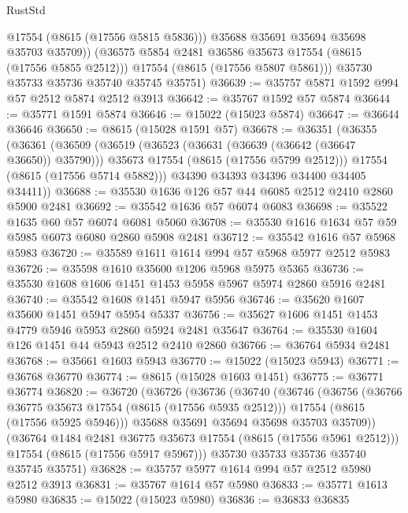 \begin{lexlean}{RustStd}
\begin{coremodule}
              @17554
              (@8615 (@17556 @5815 @5836)))
            @35688
            @35691
            @35694
            @35698
            @35703
            @35709))
        (@36575 @5854 @2481 @36586 @35673 @17554 (@8615 (@17556 @5855 @2512)))
        @17554
        (@8615 (@17556 @5807 @5861)))
      @35730
      @35733
      @35736
      @35740
      @35745
      @35751)
@36639 := @35757 @5871 @1592 @994 @57 @2512 @5874 @2512 @3913
@36642 := @35767 @1592 @57 @5874
@36644 := @35771 @1591 @5874
@36646 := @15022 (@15023 @5874)
@36647 := @36644 @36646
@36650 := @8615 (@15028 @1591 @57)
@36678 := @36351
    (@36355
      (@36361
        (@36509
          (@36519
            (@36523 (@36631 (@36639 (@36642 (@36647 @36650)) @35790)))
            @35673
            @17554
            (@8615 (@17556 @5799 @2512)))
          @17554
          (@8615 (@17556 @5714 @5882)))
        @34390
        @34393
        @34396
        @34400
        @34405
        @34411))
@36688 := @35530 @1636 @126 @57 @44 @6085 @2512 @2410 @2860 @5900 @2481
@36692 := @35542 @1636 @57 @6074 @6083
@36698 := @35522 @1635 @60 @57 @6074 @6081 @5060
@36708 := @35530 @1616 @1634 @57 @59 @5985 @6073 @6080 @2860 @5908 @2481
@36712 := @35542 @1616 @57 @5968 @5983
@36720 := @35589 @1611 @1614 @994 @57 @5968 @5977 @2512 @5983
@36726 := @35598 @1610 @35600 @1206 @5968 @5975 @5365
@36736 := @35530 @1608 @1606 @1451 @1453 @5958 @5967 @5974 @2860 @5916 @2481
@36740 := @35542 @1608 @1451 @5947 @5956
@36746 := @35620 @1607 @35600 @1451 @5947 @5954 @5337
@36756 := @35627 @1606 @1451 @1453 @4779 @5946 @5953 @2860 @5924 @2481 @35647
@36764 := @35530 @1604 @126 @1451 @44 @5943 @2512 @2410 @2860
@36766 := @36764 @5934 @2481
@36768 := @35661 @1603 @5943
@36770 := @15022 (@15023 @5943)
@36771 := @36768 @36770
@36774 := @8615 (@15028 @1603 @1451)
@36775 := @36771 @36774
@36820 := @36720
    (@36726
      (@36736
        (@36740
          (@36746
            (@36756
              (@36766 @36775 @35673 @17554 (@8615 (@17556 @5935 @2512)))
              @17554
              (@8615 (@17556 @5925 @5946)))
            @35688
            @35691
            @35694
            @35698
            @35703
            @35709))
        (@36764 @1484 @2481 @36775 @35673 @17554 (@8615 (@17556 @5961 @2512)))
        @17554
        (@8615 (@17556 @5917 @5967)))
      @35730
      @35733
      @35736
      @35740
      @35745
      @35751)
@36828 := @35757 @5977 @1614 @994 @57 @2512 @5980 @2512 @3913
@36831 := @35767 @1614 @57 @5980
@36833 := @35771 @1613 @5980
@36835 := @15022 (@15023 @5980)
@36836 := @36833 @36835

\end{coremodule}
\end{lexlean}
